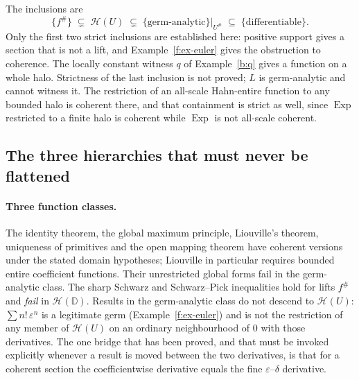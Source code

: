 \documentclass[11pt,a4paper]{article}
\numberwithin{equation}{section}
\theoremstyle{definition}
\theoremstyle{remark}
\theoremstyle{plain}
\DeclareMathOperator{\Exp}{Exp}
\newcommand{\halo}[1]{#1^{\#}}
\newcommand{\ev}[1]{#1^{\#}}
\newcommand{\Hc}{\mathcal H}
\begin{document}
The inclusions are
\[
 \{\ev f\}\;\subsetneq\;\Hc(U)\;\subsetneq\;
 \{\text{germ-analytic}\}\big|_{\halo U}\;\subseteq\;
 \{\text{differentiable}\}.
\]
Only the first two strict inclusions are established here: positive
support gives a section that is not a lift, and Example~\ref{f:ex-euler}
gives the obstruction to coherence. The locally constant witness $q$
of Example~\ref{b:q} gives a function on a whole halo. Strictness of
the last inclusion is not proved; $L$ is germ-analytic and cannot
witness it.  The restriction of an all-scale
Hahn-entire function to any bounded halo is coherent there, and that
containment is strict as well, since $\Exp$ restricted to a finite halo
is coherent while $\Exp$ is not all-scale coherent.

\subsection{The three hierarchies that must never be flattened}
\label{f:sub-threehierarchies}

\paragraph{Three function classes.}
The identity theorem, the global maximum principle, Liouville's theorem,
uniqueness of primitives and the open mapping theorem have coherent
versions under the stated domain hypotheses; Liouville in particular
requires bounded entire coefficient functions. Their unrestricted global
forms fail in the germ-analytic class.  The sharp Schwarz and
Schwarz--Pick inequalities hold for lifts $\ev f$ and \emph{fail} in
$\Hc(\mathbb D)$.  Results in the germ-analytic class do not descend to
$\Hc(U)$: $\sum n!\,\varepsilon^{n}$ is a legitimate germ
(Example~\ref{f:ex-euler}) and is not the restriction of any member of
$\Hc(U)$ on an ordinary neighbourhood of $0$ with those derivatives.
The one bridge that has been proved, and that must be invoked
explicitly whenever a result is moved between the two derivatives, is
that for a coherent section the coefficientwise derivative equals the
fine $\varepsilon$--$\delta$ derivative.
\end{document}
